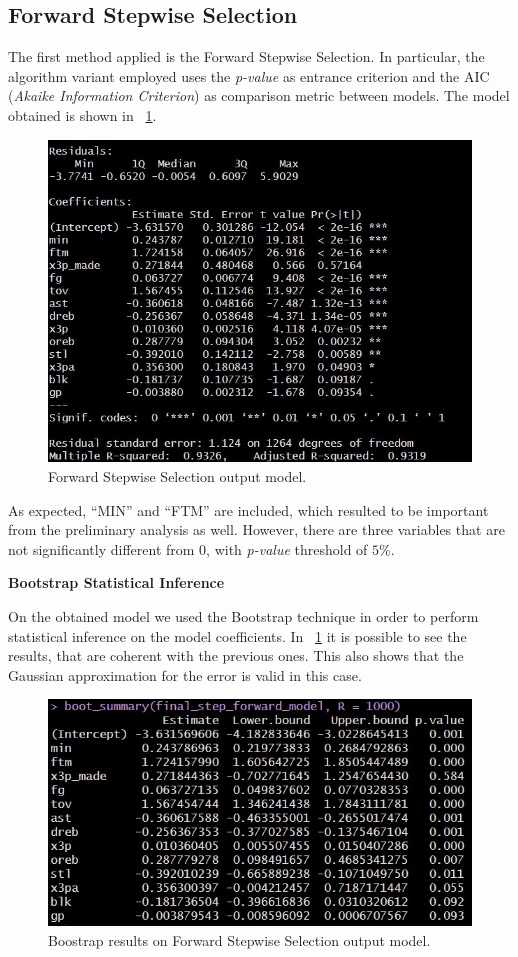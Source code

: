 \subsection{Forward Stepwise Selection}

The first method applied is the Forward Stepwise Selection. In particular, the algorithm variant employed uses the \textit{p-value} as entrance criterion and the AIC (\textit{Akaike Information Criterion}) as comparison metric between models. The model obtained is shown in \Fig~\ref{fig:ForwardModelSummary}.
\begin{figure}[h]
	\centering
	\includegraphics[width=0.35\linewidth]{ImageFiles/Regression/Forward/ForwardModelSummary}
	\caption{Forward Stepwise Selection output model.}
	\label{fig:ForwardModelSummary}
\end{figure}

As expected, ``MIN'' and ``FTM'' are included, which resulted to be important from the preliminary analysis as well. However, there are three variables that are not significantly different from 0, with \textit{p-value} threshold of $5\%$.

\vspace{0.2cm}
\noindent
\textbf{Bootstrap Statistical Inference}

On the obtained model we used the Bootstrap technique in order to perform statistical inference on the model coefficients. In \Fig~\ref{fig:ForwardModelSummary} it is possible to see the results, that are coherent with the previous ones. This also shows that the Gaussian approximation for the error is valid in this case.
\begin{figure}[h]
	\centering
	\includegraphics[width=0.4\linewidth]{ImageFiles/Regression/Forward/BootForwardModel}
	\caption{Boostrap results on Forward Stepwise Selection output model.}
	\label{fig:BootForwardModel}
\end{figure}

